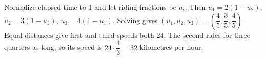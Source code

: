 Normalize elapsed time to 1 and let riding fractions be $u_i$. Then $u_1=2(1-u_2)$, $u_2=3(1-u_3)$, $u_3=4(1-u_1)$. Solving gives $(u_1,u_2,u_3)=(\dfrac{4}{5},\dfrac{3}{5},\dfrac{4}{5})$. Equal distances give first and third speeds both 24. The second rides for three quarters as long, so its speed is $24\cdot\dfrac{4}{3}=\boxed{32}$ kilometres per hour.
